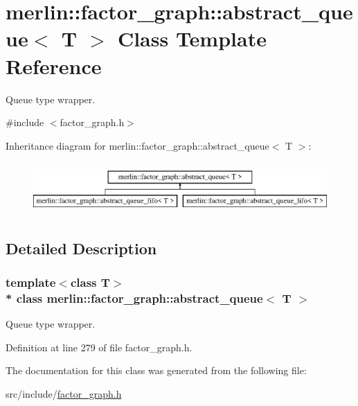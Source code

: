 \hypertarget{classmerlin_1_1factor__graph_1_1abstract__queue}{}\section{merlin\+:\+:factor\+\_\+graph\+:\+:abstract\+\_\+queue$<$ T $>$ Class Template Reference}
\label{classmerlin_1_1factor__graph_1_1abstract__queue}


Queue type wrapper.  




{\ttfamily \#include $<$factor\+\_\+graph.\+h$>$}

Inheritance diagram for merlin\+:\+:factor\+\_\+graph\+:\+:abstract\+\_\+queue$<$ T $>$\+:\begin{figure}[H]
\begin{center}
\leavevmode
\includegraphics[height=1.992882cm]{classmerlin_1_1factor__graph_1_1abstract__queue}
\end{center}
\end{figure}


\subsection{Detailed Description}
\subsubsection*{template$<$class T$>$\\*
class merlin\+::factor\+\_\+graph\+::abstract\+\_\+queue$<$ T $>$}

Queue type wrapper. 

Definition at line 279 of file factor\+\_\+graph.\+h.



The documentation for this class was generated from the following file\+:\begin{DoxyCompactItemize}
\item 
src/include/\hyperlink{factor__graph_8h}{factor\+\_\+graph.\+h}\end{DoxyCompactItemize}
